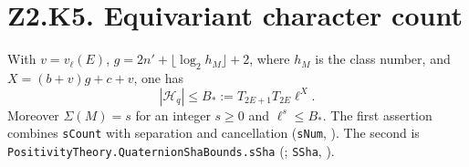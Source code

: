 \section*{Z2.K5. Equivariant character count}

\begin{proposition}\label{prop:P-k-count}
With $v=v_\ell(E)$, $g=2n'+\lfloor\log_2 h_M\rfloor+2$, where $h_M$ is
the class number, and $X=(b+v)g+c+v$, one has
\[
 |\mathcal H_q|\le B_*:=T_{2E+1}T_{2E}\ell^X.
\]
Moreover $\Sigma(M)=s$ for an integer $s\ge0$ and $\ell^s\le B_*$.
The first assertion combines \nolinkurl{sCount} with separation
and cancellation (\nolinkurl{sNum}, ).
The second is \nolinkurl{PositivityTheory.QuaternionShaBounds.sSha}
(;
\nolinkurl{SSha}, ).
\end{proposition}
